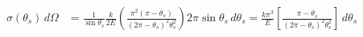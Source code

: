 \documentclass[]{article}
\begin{document}
	\begin{equation}
		\begin{split}
			\sigma(\theta_s) \, d\Omega &= \frac{1}{\sin \theta_s} \frac{k}{2E} \left( \frac{\pi^2(\pi - \theta_s)}{(2\pi - \theta_s)^2\theta^2_s} \right) 2\pi \sin \theta_s \, d\theta_s
			= \frac{k\pi^3}{E} \left[ \frac{\pi - \theta_s}{(2\pi - \theta_s)^2 \theta_s^2} \right] \, d\theta_s \\
		\end{split}
	\end{equation}
\end{document}
